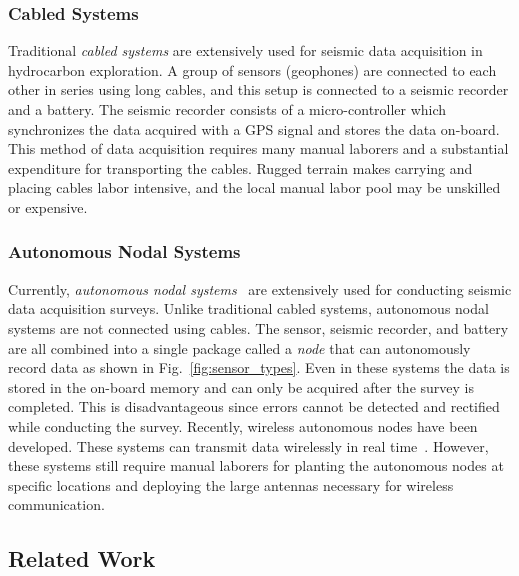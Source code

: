 \subsubsection{Cabled Systems}
 Traditional \emph{cabled systems} are extensively used for seismic data acquisition in hydrocarbon exploration. A group of sensors (geophones) are connected to each other in series using long cables, and this setup is connected to a seismic recorder and a battery. The seismic recorder consists of a micro-controller which synchronizes the data acquired with a GPS signal and stores the data on-board. 
 This method of data acquisition requires many manual laborers and a substantial expenditure for transporting the cables. 
 Rugged terrain makes carrying and placing cables labor intensive, and the local manual labor pool may be unskilled or expensive.
   
 \subsubsection{Autonomous Nodal Systems}
 Currently, \emph{autonomous nodal systems}~\cite{wood1998distributed} are extensively used for conducting seismic data acquisition surveys. Unlike traditional cabled systems, autonomous nodal systems are not connected using cables. The sensor, seismic recorder, and battery are all combined into a single package called a \emph{node} that can autonomously record data as shown in Fig.~\ref{fig:sensor_types}. Even in these systems the data is stored in the on-board memory and can only be acquired after the survey is completed. This is disadvantageous since errors cannot be detected and rectified while conducting the survey. Recently, wireless autonomous nodes have been developed. These systems can transmit data wirelessly in real time~\cite{jiang2015geophysical}. However, these systems still require manual laborers for planting the autonomous nodes at specific locations and deploying the large antennas necessary for wireless communication.
 
\subsection{Related Work}

